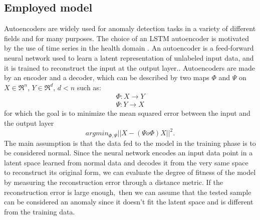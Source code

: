 \documentclass{article}
\begin{document}
\begin{multicols*}{2}
\section{Employed model}
		\label{model}
Autoencoders are widely used for anomaly detection tasks in a variety of different fields and for many purposes. The choice of an LSTM autoencoder is motivated by the use of time series in the health domain \cite{VitalDB}. An autoencoder is a feed-forward neural network used to learn a latent representation of unlabeled input data, and it is trained to reconstruct the input at the output layer.. Autoencoders are made by an encoder and a decoder, which can be described by two maps $\Phi$  and $\Psi$ on $X \in \Re^n$, $Y \in \Re^d$, $d < n$ such as:
\begin{align*}
			\Phi : X \rightarrow  Y \\
			\Psi : Y \rightarrow  X  
\end{align*}
for which the goal is to minimize the mean squared error between the input and the output layer
\begin{equation*}
			argmin_{\Phi,\Psi}|| X -  (\Psi  o \Phi) X ||^2.
\end{equation*}
The main assumption is that the data fed to the model in the training phase is to be considered normal. Since the neural network encodes an input data point in a latent space learned from normal data and decodes it from the very same space to reconstruct its original form, we can evaluate the degree of fitness of the model by measuring the reconstruction error through a distance metric. If the reconstruction error is large enough, then we can assume that the tested sample can be considered an anomaly since it doesn't fit the latent space and is different from the training data.

	

\end{multicols*}
\end{document}
